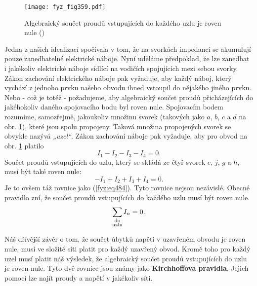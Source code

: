   \begin{figure}[ht!] %
    \centering
    \texttt{[image: fyz\_fig359.pdf]}
    \caption{Algebraický součet proudů vstupujících do každého uzlu je roven nule
             (\cite[s.~400]{Feynman02})}
    \label{fyz:fig359}
  \end{figure}
  
  Jedna z našich idealizací spočívala v tom, že na svorkách impedancí se akumulují pouze 
  zanedbatelné elektrické náboje. Nyní uděláme předpoklad, že lze zanedbat i jakékoliv elektrické 
  náboje sídlící na vodičích spojujících mezi sebou svorky. Zákon zachování elektrického náboje pak 
  vyžaduje, aby každý náboj, který vychází z jednoho prvku našeho obvodu ihned vstoupil do nějakého 
  jiného prvku. Nebo - což je totéž - požadujeme, aby algebraický součet proudů přicházejících do 
  jakéhokoliv daného spojovacího bodu byl roven nule. Spojovacím bodem rozumíme, samozřejmě, 
  jakoukoliv množinu svorek (takových jako \(a\), \(b\), \(c\) a \(d\) na obr. \ref{fyz:fig359}), 
  které jsou spolu propojeny. Taková množina propojených svorek se obvykle nazývá \emph{„uzel“}. 
  Zákon zachování náboje pak vyžaduje, aby pro obvod na obr. \ref{fyz:fig359} platilo
  \begin{equation}\label{fyz:eq484}
    I_1 - I_2 - I_3 - I_4 = 0.
  \end{equation}
  Součet proudů vstupujících do uzlu, který se skládá ze čtyř svorek \(e\), \(j\), \(g\) a \(h\), 
  musí být také roven nule:
  \begin{equation}\label{fyz:eq485}
    - I_1 + I_2 + I_3 + I_4 = 0.
  \end{equation}
  Je to ovšem táž rovnice jako (\ref{fyz:eq484}). Tyto rovnice nejsou nezávislé. Obecné pravidlo 
  zní, že součet proudů vstupujících do každého uzlu musí být roven nule.
  \begin{equation}\label{fyz:eq486}
    \sum_{\mathclap{\substack{\text{do}\\\text{uzlu}}}} I_n = 0.
  \end{equation}
  
  Náš dřívější závěr o tom, že součet úbytků napětí v uzavřeném obvodu je roven nule, musí ve 
  složité síti platit pro každý uzavřený obvod. Kromě toho pro každý uzel musí platit náš výsledek, 
  že algebraický součet proudů vstupujících do uzlu je roven nule. Tyto dvě rovnice jsou známy jako 
  \textbf{Kirchhoffova pravidla}. Jejich pomocí lze najít proudy a napětí v jakékoliv síti.
  

